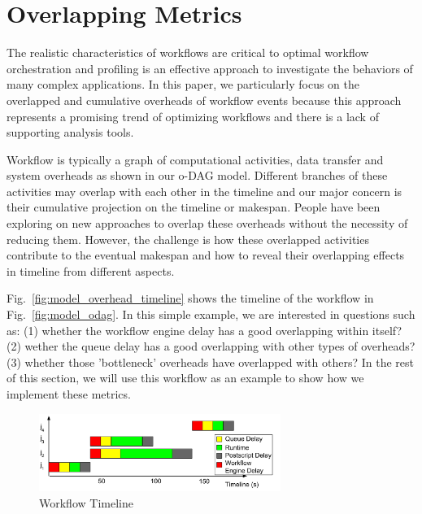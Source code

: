 
\section{Overlapping Metrics}
\label{sec:profiling}

The realistic characteristics of workflows are critical to optimal workflow orchestration and profiling is an effective approach to investigate the behaviors of many complex applications. In this paper, we particularly focus on the overlapped and cumulative overheads of workflow events because this approach represents a promising trend of optimizing workflows and there is a lack of supporting analysis tools.

Workflow is typically a graph of computational activities, data transfer and system overheads as shown in our o-DAG model. Different branches of these activities may overlap with each other in the timeline and our major concern is their cumulative projection on the timeline or makespan. People have been exploring on new approaches to overlap these overheads without the necessity of reducing them. However, the challenge is how these overlapped activities contribute to the eventual makespan and how to reveal their overlapping effects in timeline from different aspects.  


Fig.~\ref{fig:model_overhead_timeline} shows the timeline of the workflow in Fig.~\ref{fig:model_odag}. In this simple example, we are interested in questions such as: (1) whether the workflow engine delay has a good overlapping within itself? (2) wether the queue delay has a good overlapping with other types of overheads? (3) whether those 'bottleneck' overheads have overlapped with others? In the rest of this section, we will use this workflow as an example to show how we implement these metrics. 

\begin{figure}[!htb]
	\centering
    \includegraphics[width=0.7\textwidth]{figures/profiling/overhead_timeline.pdf}
    \caption{Workflow Timeline}
    \label{fig:profiling_overhead_timeline}
\end{figure}

